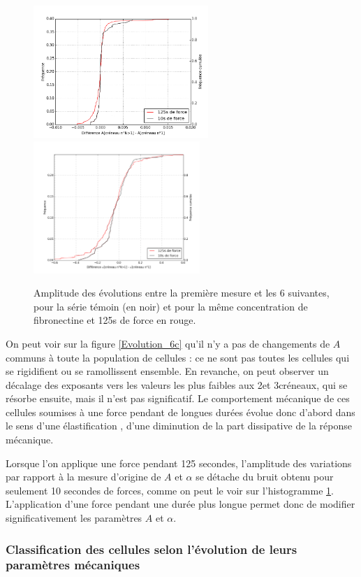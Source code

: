 \begin{figure}
\includegraphics[height=5cm]{Figures/A_diff_seul.png} 
\includegraphics[height=5cm]{Figures/E_diff_seul.png}
\caption{Amplitude des évolutions entre la première mesure et les 6 suivantes, pour la série  témoin (en noir) et pour la même concentration de fibronectine et 125s de force en rouge.}
\label{Diff}
\end{figure}
On peut voir sur la figure \ref{Evolution_6c} qu'il n'y a pas de changements de $A$ communs à toute la population de cellules : ce ne sont pas toutes les cellules qui se rigidifient ou se ramollissent ensemble. 
En revanche, on peut observer un décalage des exposants vers les valeurs les plus faibles aux 2\ieme  et 3\ieme créneaux, qui se résorbe ensuite, mais il n'est pas significatif. 
Le comportement mécanique de ces cellules soumises à une force pendant de longues durées évolue donc d'abord dans le sens d'une \og élastification \fg , d'une diminution de la part dissipative de la réponse mécanique. 

Lorsque l'on applique une force pendant 125 secondes, l'amplitude des variations par rapport à la mesure d'origine de $A$ et $\alpha$ se détache du bruit obtenu pour seulement 10 secondes de forces, comme on peut le voir sur l'histogramme \ref{Diff}. L'application d'une force pendant une durée plus longue permet donc de modifier significativement les paramètres $A$ et $\alpha$. 

\subsubsection{Classification des cellules selon l'évolution de leurs paramètres mécaniques}

